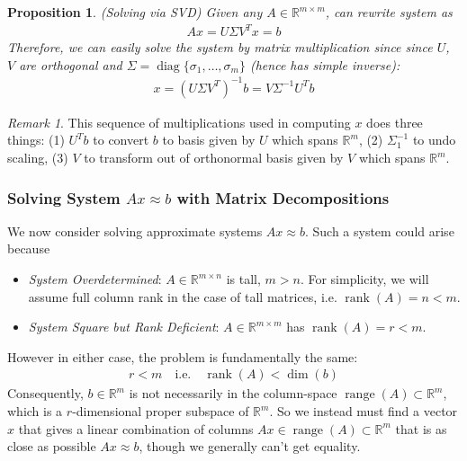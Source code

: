 \documentclass[12pt]{book}
\numberwithin{equation}{section} %
\theoremstyle{plain}
\newtheorem{prop}[thm]{Proposition}
\theoremstyle{definition}
\theoremstyle{remark}
\newtheorem*{rmk}{Remark}
\newcommand{\diag}{\operatorname{diag}}
\newcommand{\Rm}{\mathbb{R}^m}
\newcommand{\Rmn}{\mathbb{R}^{m\times n}}
\newcommand{\Rmm}{\mathbb{R}^{m\times m}}
\newcommand{\range}{\operatorname{range}}
\newcommand{\rank}{\operatorname{rank}}
\begin{document}
\begin{prop}
\emph{(Solving via SVD)}
Given any $A\in\Rmm$, can rewrite system as
\begin{align*}
  Ax
  = U\Sigma V^Tx
  = b
\end{align*}
Therefore, we can easily solve the system by matrix multiplication
since since $U$, $V$ are orthogonal and
$\Sigma=\diag\{\sigma_1,\ldots,\sigma_m\}$ (hence has simple inverse):
\begin{align*}
  x
  = (U\Sigma V^T)^{-1}b
  = V\Sigma^{-1}U^Tb
\end{align*}
\end{prop}
\begin{rmk}
This sequence of multiplications used in computing $x$ does three
things:
(1) $U^Tb$ to convert $b$ to basis given by $U$ which spans $\Rm$, (2)
$\Sigma_1^{-1}$ to undo scaling, (3) $V$ to transform out of orthonormal
basis given by $V$ which spans $\Rm$.
\end{rmk}


\clearpage
\subsubsection{Solving System $Ax\approx b$ with Matrix Decompositions}

We now consider solving approximate systems $Ax\approx b$.
Such a system could arise because
\begin{itemize}
  \item \emph{System Overdetermined}: $A\in\Rmn$ is tall, $m>n$.
    For simplicity, we will assume full column rank in the case of tall
    matrices, i.e.  $\rank(A)=n<m$.
  \item \emph{System Square but Rank Deficient}:
    $A\in\Rmm$ has $\rank(A)=r<m$.
\end{itemize}
However in either case, the problem is fundamentally the same:
\begin{align*}
  r < m
  \quad\text{i.e.}\quad
  \rank(A)<\dim(b)
\end{align*}
Consequently, $b\in\Rm$ is not necessarily in the column-space
$\range(A)\subset\Rm$, which is a $r$-dimensional proper subspace of
$\Rm$.  So we instead must find a vector $x$ that gives a linear
combination of columns $Ax\in\range(A)\subset\Rm$ that is as close as
possible $Ax\approx b$, though we generally can't get equality.
\end{document}
